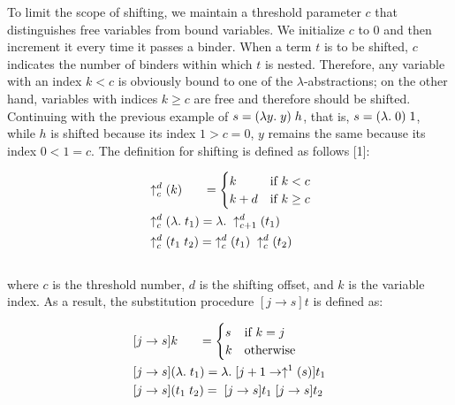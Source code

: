 \documentclass[fleqn, 11pt]{article}
\begin{document}
To limit the scope of shifting, we maintain a threshold parameter $c$ that distinguishes free variables from bound variables. We initialize $c$ to 
0 and then increment it every time it passes a binder. When a term $t$ is to be shifted, $c$ indicates the number of binders within which $t$  
is nested. Therefore, any variable with an index $k < c$ is obviously bound to one of the $\lambda$-abstractions; on the other hand, 
variables with indices $k \geq c$ are free and therefore should be shifted. Continuing with the previous example of $s = (\lambda y . \hspace{1mm} y) \hspace{1mm} h$, 
that is, $s = (\lambda . \hspace{1mm} 0) \hspace{1mm} 1$, while $h$ is shifted because its index $1 > c = 0$, $y$ remains the same because 
its index $0 < 1 = c$. The definition for shifting is defined as follows [1]:

\begin{align*}
&\uparrow _c^d(k) \hspace{6mm}= 
    \begin{cases}   
        k & \text{if $k<c$} \\
        k + d & \text{if $k \geq c$} \\
    \end{cases} \\
&\uparrow _c^d(\lambda . \hspace{1mm} t_1) = \lambda . \hspace{1mm} \uparrow _{c+1}^d (t_1) \\
&\uparrow _c^d(t_1 \hspace{1mm} t_2) = \hspace{1mm} \uparrow _c^d(t_1) \hspace{1mm} \uparrow _c^d(t_2)
\end{align*} \\

\noindent
where $c$ is the threshold number, $d$ is the shifting offset, and $k$ is the variable index. As a result, the substitution 
procedure $[j \rightarrow s]t$ is defined as:

\begin{align*}
    &[j \rightarrow s]k \hspace{6mm}= 
        \begin{cases}   
            s & \text{if $k=j$} \\
            k & \text{otherwise} \\
        \end{cases} \\
    &[j \rightarrow s](\lambda . \hspace{1mm} t_1) = \lambda . \hspace{1mm} [j + 1 \rightarrow \uparrow^1 (s)]t_1 \\
    &[j \rightarrow s](t_1 \hspace{1mm} t_2) = \hspace{1mm} [j \rightarrow s]t_1 \hspace{1mm} [j \rightarrow s]t_2
\end{align*} \\
\end{document}
